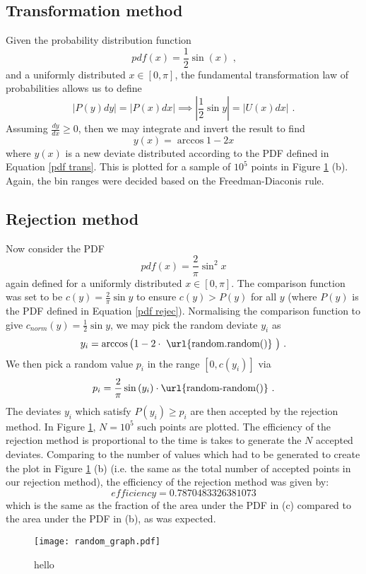 \documentclass[paper=a4, fontsize=11pt]{scrartcl}
\begin{document}
\subsection{Transformation method}
Given the probability distribution function
\begin{equation}
\label{pdf trans}
pdf(x) = \frac{1}{2} \sin(x) \text{ ,}
\end{equation}
and a uniformly distributed $x \in [0,\pi]$, the fundamental transformation law of probabilities allows us to define 
\begin{equation}
| P(y) dy | = |P(x) dx | \implies |\frac{1}{2} \sin{y} | = |U(x) dx| \text{ .}
\end{equation}
Assuming $\frac{dy}{dx} \geq 0$, then we may integrate and invert the result to find
\begin{equation}
y(x) = \arccos{ 1-2x }
\end{equation}
where $y(x)$ is a new deviate distributed according to the PDF defined in Equation \ref{pdf trans}. This is plotted for a sample of $10^{5}$ points in Figure \ref{random graph} (b). Again, the bin ranges were decided based on the Freedman-Diaconis rule. 

\subsection{Rejection method}
Now consider the PDF
\begin{equation}
\label{pdf rejec}
pdf(x) = \frac{2}{\pi} \sin^{2}{x}
\end{equation}
again defined for a uniformly distributed $x \in [0,\pi]$. The comparison function was set to be $c(y) = \frac{2}{\pi} \sin{y}$ to ensure $c(y) > P(y)$ for all $y$ (where $P(y)$ is the PDF defined in Equation \ref{pdf rejec}). Normalising the comparison function to give $c_{norm}(y) = \frac{1}{2} \sin{y}$, we may pick the random deviate $y_{i}$ as
\begin{equation}
y_{i} = \arccos{\big( 1-2 \cdot \text{ \url{random.random()} } \big)} \text{ .}
\end{equation}
We then pick a random value $p_{i}$ in the range $[0, c(y_{i})]$ via
\begin{equation}
p_{i} = \frac{2}{\pi} \sin{(y_{i})} \cdot \text{\url{random-random()}} \text{ .}
\end{equation}
The deviates $y_{i}$ which satisfy $P(y_{i}) \geq p_{i}$ are then accepted by the rejection method. In Figure \ref{random graph}, $N=10^{5}$ such points are plotted. The efficiency of the rejection method is proportional to the time is takes to generate the $N$ accepted deviates. Comparing to the number of values which had to be generated to create the plot in Figure \ref{random graph} (b) (i.e. the same as the total number of accepted points in our rejection method), the efficiency of the rejection method was given by:
\begin{equation}
efficiency= 0.7870483326381073
\end{equation}
which is the same as the fraction of the area under the PDF in (c) compared to the area under the PDF in (b), as was expected. 

\begin{figure}
	\centering
	\texttt{[image: random\_graph.pdf]}
	\caption{\footnotesize{hello}}
	\label{random graph}
\end{figure}

\end{document}
